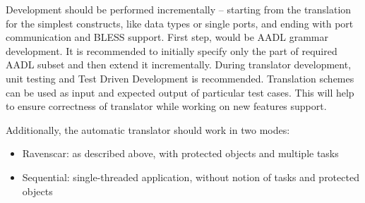 Development should be performed incrementally -- starting from the translation for the simplest constructs, like data types or single ports, and ending with port communication and BLESS support. First step, would be AADL grammar development. It is recommended to initially specify only the part of required AADL subset and then extend it incrementally. During translator development, unit testing and Test Driven Development is recommended. Translation schemes can be used as input and expected output of particular test cases. This will help to ensure correctness of translator while working on new features support.

Additionally, the automatic translator should work in two modes:
\begin{itemize}
	\item Ravenscar: as described above, with protected objects and multiple tasks
	\item Sequential: single-threaded application, without notion of tasks and protected objects	
\end{itemize}
